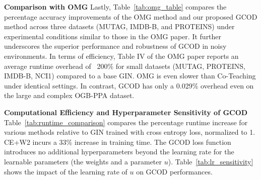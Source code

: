 \textbf{Comparison with OMG}
Lastly, Table~\ref{tab:omg_table} compares the percentage accuracy improvements of the OMG method and our proposed {GCOD} method across three datasets (MUTAG, IMDB-B, and PROTEINS) under experimental conditions similar to those in the OMG paper. It further underscores the superior performance and robustness of {GCOD} in noisy environments. In terms of efficiency, Table IV of the OMG paper reports an average runtime overhead of ~200\% for small datasets (MUTAG, PROTEINS, IMDB-B, NCI1) compared to a base GIN. OMG is even slower than Co-Teaching under identical settings. In contrast, GCOD has only a 0.029\% overhead even on the large and complex OGB-PPA dataset.

\textbf{Computational Efficiency and Hyperparameter Sensitivity of GCOD} 
Table~\ref{tab:runtime_comparison} compares the percentage runtime increase for various methods relative to GIN trained with cross entropy loss, normalized to 1. {CE+W2} incurs a 33\% increase in training time. The GCOD loss function introduces no additional hyperparameters beyond the learning rate for the learnable parameters (the weights and a parameter $u$). Table~\ref{tab:lr_sensitivity} shows the impact of the learning rate of $u$ on GCOD performances.






